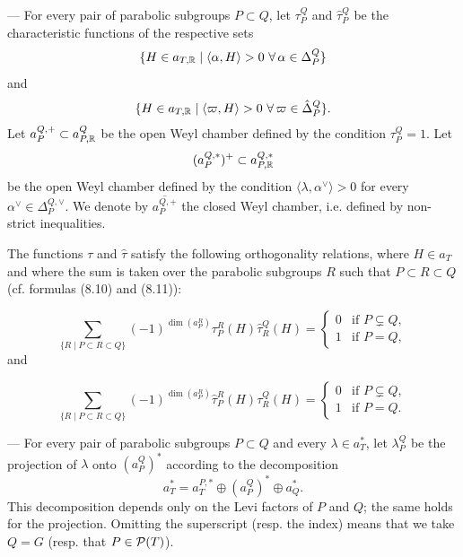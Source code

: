\begin{paragr} --- \label{S:notations3} For every pair of parabolic subgroups $P\subset Q$, let $\tau_P^Q$ and $\hat{\tau}_P^Q$ be the characteristic functions of the respective sets 
$$\{H\in a_{T,\mathbb{R}} \mid \langle \alpha,H\rangle>0 \,\,\forall \, \alpha\in \Delta_P^Q\}$$
and
$$\{H\in a_{T,\mathbb{R}} \mid \langle \varpi,H\rangle >0 \,\,\forall \, \varpi \in \hat{\Delta}_P^Q\}.$$
Let $a_P^{Q,+}\subset a_{P,\mathbb{R}}^Q$ be the open Weyl chamber defined by the condition $\tau_P^Q=1$. Let 
$$(a_P^{Q,*})^+ \subset a_{P,\mathbb{R}}^{Q,*}$$
be the open Weyl chamber defined by the condition $\langle \lambda , \alpha^\vee\rangle >0$ for every $\alpha^\vee \in   \Delta_P^{Q,\vee}$. We denote by $\overline{a_P^{Q,+}}$ the closed Weyl chamber, i.e. defined by non-strict inequalities.

The functions $\tau$ and $\hat{\tau}$ satisfy the following \og orthogonality relations\fg{}, where $H\in a_T$ and where the sum is taken over the parabolic subgroups $R$ such that $P\subset R\subset Q$ (cf. \cite{ar-intro} formulas (8.10) and (8.11)):

\begin{equation}
  \label{eq:orthog1}
\sum_{\{R \mid P\subset R\subset Q\}  } (-1)^{\dim(a_P^R)}\tau_P^R(H)\hat{\tau}_R^Q(H)=\begin{cases} 0 & \text{if } P \subsetneq Q, \\ 1 & \text{if } P= Q,
  \end{cases}
\end{equation}
and

\begin{equation}
  \label{eq:orthog2}
\sum_{\{R \mid P\subset R\subset Q\}  } (-1)^{\dim(a_P^R)}\hat{\tau}_P^R(H)\tau_R^Q(H)=\begin{cases} 0 & \text{if } P \subsetneq Q, \\ 1 & \text{if } P= Q.
  \end{cases}
\end{equation}
\end{paragr}

\begin{paragr}[Projection.] --- For every pair of parabolic subgroups $P\subset Q$ and every $\lambda\in a_T^*$, let $\lambda_P^Q$ be the projection of $\lambda$ onto $(a_P^Q)^*$ according to the decomposition 
$$a_T^*=a_T^{P,*}\oplus (a_P^Q)^*\oplus a_Q^*.$$ 
This decomposition depends only on the Levi factors of $P$ and $Q$; the same holds for the projection. Omitting the superscript (resp. the index) means that we take $Q=G$ (resp. that $P\in \mathcal{P}(T)$).
\end{paragr}

